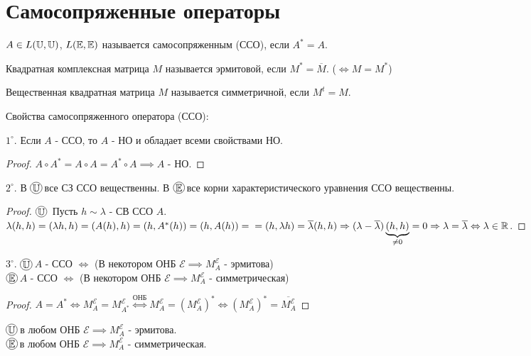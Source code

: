 \documentclass[../main.tex]{subfiles}
\begin{document}
\section{Самосопряженные операторы}
\begin{definition}
    $A \in L(\mathbb{U},\mathbb{U})$, $L(\mathbb{E},\mathbb{E})$ называется самосопряженным (ССО), если $A^{*} = A$. 
\end{definition}
\begin{definition}
    Квадратная комплексная матрица $M$ называется эрмитовой, если $M^{*} = \overline{M}$. ($\Leftrightarrow M= M^{*}$)

\end{definition}
\begin{definition}
    Вещественная квадратная матрица $M$ называется симметричной, если $M^{t} = M$. 
\end{definition}
Свойства самосопряженного оператора (ССО):

$1^{\circ}$. Если $A$ - ССО, то $A$ - НО и обладает всеми свойствами НО.
\begin{proof}
    $A \circ A^{*} = A \circ A = A^{*} \circ A \implies A$ - НО.
\end{proof}
$2^{\circ}$. В $\tcircle{$\U$}$ \; все СЗ ССО вещественны. В $\tcircle{$\E$}$\; все корни характеристического уравнения ССО вещественны.
\begin{proof}
    $\tcircle{$\U$}\; $ Пусть $h \sim \lambda$ - СВ ССО $A$. $\lambda (h,h) = (\lambda h, h) = (A(h),h) = (h,A^{*}(h)) = (h, A(h)) =\\= (h,\lambda h) = \overline{\lambda} (h,h) \Rightarrow (\lambda - \overline{\lambda})\underbrace{(h,h)}_{\neq 0} = 0 \Rightarrow \lambda = \overline{\lambda} \Leftrightarrow \lambda \in \mathbb{R}$.
\end{proof}


$3^{\circ}$. $\tcircle{$\U$}$\; $A$ - ССО $\Leftrightarrow$ (В некотором ОНБ $\mathcal{E} \implies M_{A}^{\mathcal{E}}$ - эрмитова) \\ 
$\tcircle{$\E$}$\; $A$ - ССО $\Leftrightarrow$ (В некотором ОНБ $\mathcal{E} \implies M_{A}^{\mathcal{E}}$ - симметрическая)
\begin{proof}
    $A = A^{*} \Leftrightarrow M_{A}^{\mathcal{E}} = M_{A^{*}}^{\mathcal{E}}\overset{\text{ОНБ}}{\Leftrightarrow } M_{A}^{\mathcal{E}} = (M_{A}^{\mathcal{E}})^{*} \Leftrightarrow (M_{A}^{\mathcal{E}})^{*} = \overline{M_{A}^{\mathcal{E}}} $
\end{proof}
\begin{corollary}
    $\tcircle{$\U$}$ в любом ОНБ $\mathcal{E} \implies M_{A}^{\mathcal{E}}$ - эрмитова. \\ 
$\tcircle{$\E$}$ в любом ОНБ $\mathcal{E} \implies M_{A}^{\mathcal{E}}$ - симметрическая.
\end{corollary}
\end{document}
